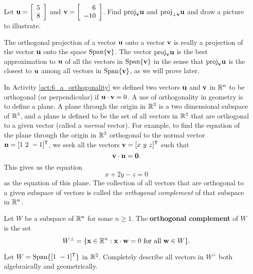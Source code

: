 \begin{activity} Let $\mathbf{u} = \left[ \begin{array}{c} 5\\8 \end{array} \right]$ and $\mathbf{v} = \left[ \begin{array}{r} 6\\-10 \end{array} \right]$. Find $\text{proj}_{\mathbf{v}} \mathbf{u}$ and $\text{proj}_{\perp \mathbf{v}} \mathbf{u}$ and draw a picture to illustrate.

\end{activity}

The orthogonal projection of a vector $\mathbf{u}$ onto a vector $\mathbf{v}$ is really a projection of the vector $\mathbf{u}$ onto the space $\text{Span}\{\mathbf{v}\}$. The vector $\text{proj}_{\mathbf{v}} \mathbf{u}$ is the best approximation to $\mathbf{u}$ of all the vectors in $\text{Span}\{\mathbf{v}\}$ in the sense that $\text{proj}_{\mathbf{v}} \mathbf{u}$ is the closest to $\mathbf{u}$ among all vectors in $\text{Span}\{\mathbf{v}\}$, as we will prove later.


In Activity \ref{act:6_a_orthogonality} we defined two vectors $\mathbf{u}$ and $\mathbf{v}$ in $\mathbb{R}^n$ to be orthogonal (or perpendicular) if $\mathbf{u} \cdot \mathbf{v} = 0$. A use of orthogonality in geometry is to define a plane. A plane through the origin in $\mathbb{R}^3$ is a two dimensional subspace of $\mathbb{R}^3$, and a plane is defined to be the set of all vectors in $\mathbb{R}^3$ that are orthogonal to a given vector (called a \emph{normal} vector).  For example, to find the equation of the plane through the origin in $\mathbb{R}^3$ orthogonal to the normal vector $\mathbf{n} = [1 \ 2 \ -1]^{\mathsf{T}}$, we seek all the vectors $\mathbf{v} = [x \  y \ z]^{\mathsf{T}}$ such that
\[\mathbf{v} \cdot \mathbf{n} = \mathbf{0}.\]
This gives us the equation 
\[x+2y-z = 0\]
as the equation of this plane. The collection of all vectors that are orthogonal to a given subspace of vectors is called the \emph{orthogonal complement} of that subspace in $\mathbb{R}^n$.

\begin{definition} \label{def:6_a_orth_complement} Let $W$ be a subspace of $\mathbb{R}^n$ for some $n \geq 1$. The \textbf{orthogonal complement} of $W$ is the set
\[W^{\perp} = \{\mathbf{x} \in \mathbb{R}^n : \mathbf{x} \cdot \mathbf{w} = 0 \text{ for all } \mathbf{w} \in W\}.\]
\end{definition}

\begin{pa} \label{pa:6_a_2} Let $W = \text{Span}\{[1 \ -1]^{\mathsf{T}}\}$ in $\mathbb{R}^2$. Completely describe all vectors in $W^{\perp}$ both algebraically and geometrically.

\end{pa}


